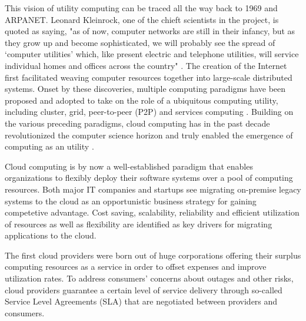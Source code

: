\documentclass[utf8,english]{gradu3}
\begin{document}
This vision of utility computing can be traced all the way back to 1969 and ARPANET. Leonard Kleinrock, one of the chieft scientists in the project, is quoted as saying, "as of now, computer networks are still in their infancy, but as they grow up and become sophisticated, we will probably see the spread of ‘computer utilities’ which, like present electric and telephone utilities, will service individual homes and offices across the country" \parencite{kleinrock03internet}. The creation of the Internet first facilitated weaving computer resources together into large-scale distributed systems. Onset by these discoveries, multiple computing paradigms have been proposed and adopted to take on the role of a ubiquitous computing utility, including cluster, grid, peer-to-peer (P2P) and services computing \parencite{buyya09cloud}. Building on the various preceding paradigms, cloud computing has in the past decade revolutionized the computer science horizon and truly enabled the emergence of computing as an utility \parencite{buyya2017manifesto}.


Cloud computing is by now a well-established paradigm that enables organizations to flexibly deploy their software systems over a pool of computing resources. Both major IT companies and startups see migrating on-premise legacy systems to the cloud as an opportunistic business strategy for gaining competetive advantage. Cost saving, scalability, reliability and efficient utilization of resources as well as flexibility are identified as key drivers for migrating applications to the cloud. \parencite{jamshidi13cloudmigrationreview}

The first cloud providers were born out of huge corporations offering their surplus computing resources as a service in order to offset expenses and improve utilization rates. To address consumers' concerns about outages and other risks, cloud providers guarantee a certain level of service delivery through so-called Service Level Agreements (SLA) that are negotiated between providers and consumers. \parencite{youseff08cloudOntology}
\end{document}
